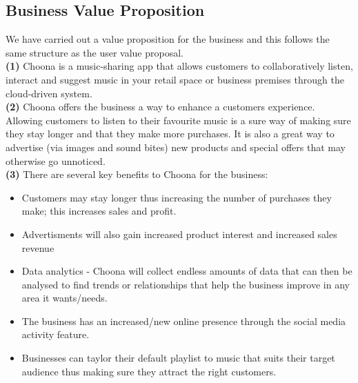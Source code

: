 \subsection{Business Value Proposition}
We have carried out a value proposition for the business and this follows the same structure as the user value proposal.\\

\textbf{(1)} Choona is a music-sharing app that allows customers to collaboratively listen, interact and suggest music in your retail space or business premises through the cloud-driven system.  \\

\textbf{(2)} Choona offers the business a way to enhance a customers experience.  Allowing customers to listen to their favourite music is a sure way of making sure they stay longer and that they make more purchases.  It is also a great way to advertise (via images and sound bites) new products and special offers that may otherwise go unnoticed.  \\

\textbf{(3)} There are several key benefits to Choona for the business:
\begin{itemize}
\item Customers may stay longer thus increasing the number of purchases they make; this increases sales and profit.
\item Advertisments will also gain increased product interest and increased sales revenue
\item Data analytics - Choona will collect endless amounts of data that can then be analysed to find trends or relationships that help the business improve in any area it wants/needs.  
\item The business has an increased/new online presence through the social media activity feature. 
\item Businesses can taylor their default playlist to music that suits their target audience thus making sure they attract the right customers.
\end{itemize} 

